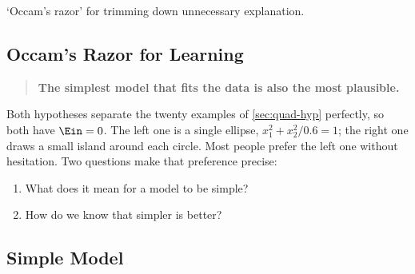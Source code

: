 \begin{moral}
    `Occam's razor' for trimming down unnecessary explanation.
\end{moral}

\subsection{Occam's Razor for Learning}

\begin{quote}
    \textbf{The simplest model that fits the data is also the most
    plausible.}
\end{quote}

\begin{center}
\end{center}

Both hypotheses separate the twenty examples of \autoref{sec:quad-hyp}
perfectly, so both have \(\Ein = 0\). The left one is a single ellipse,
\(x_1^2 + x_2^2 / 0.6 = 1\); the right one draws a small island around each
circle. Most people prefer the left one without hesitation. Two questions
make that preference precise:
\begin{enumerate}[(1)]
    \item What does it mean for a model to be simple?
    \item How do we know that simpler is better?
\end{enumerate}

\subsection{Simple Model}

